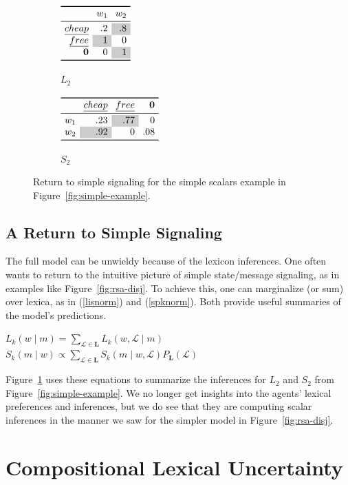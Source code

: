 \documentclass[12pt,twoside]{article}
\newcommand{\Figref}[1]{Figure~\ref{#1}}
\newcommand{\figref}[1]{Figure~\ref{#1}}
\newcommand{\eg}[1]{(\ref{#1})}
\newcommand{\word}[1]{\emph{#1}}
\newcommand{\given}{\mid}
\newcommand{\state}{w}
\newcommand{\Lex}{\mathcal{L}}
\newcommand{\LexSet}{\mathbf{L}}
\newcommand{\msg}{m}
\newcommand{\LexPrior}{P_{\LexSet}}
\newcommand{\SpeakerK}[1][k]{S_{#1}}
\newcommand{\ListenerK}[1][k]{L_{#1}}
\newcommand{\nullmsg}{\mathbf{0}}
\newcommand{\graycell}[1]{{\cellcolor[gray]{.8}#1}}
\newcommand{\lextoprule}{\specialrule{\heavyrulewidth}{1.5pt}{1.5pt}}
\newcommand{\lexmidrule}{\specialrule{\lightrulewidth}{1.5pt}{1.5pt}}
\newcommand{\lexbottomrule}{\specialrule{\heavyrulewidth}{1.5pt}{1.5pt}}
\newcommand{\examplelistener}[4][]{
  \setlength{\arraycolsep}{4pt}
  \begin{array}[c]{*{3}{r}}
    \lextoprule
    #1           & w_{1} & w_{2} \\
    \lexmidrule
    \word{cheap} & #2 \\
    \word{free}  & #3 \\
    \nullmsg     & #4 \\
    \lexbottomrule
  \end{array}}
\newcommand{\examplespeaker}[3][]{
  \setlength{\arraycolsep}{4pt}
  \begin{array}[c]{*{4}{r}}
    \lextoprule
    #1           & \word{cheap} & \word{free} & \nullmsg \\
    \lexmidrule
    w_{1} & #2 \\
    w_{2} & #3 \\
    \lexbottomrule
  \end{array}}
\renewcommand{\_}{\textbf{\textunderscore\hspace{-4pt}\textunderscore\hspace{-3pt}\textunderscore\hspace{-4pt}\textunderscore}\hspace{0.5pt}}			%
\begin{document}
\begin{figure}[tp]
  \centering
  \renewcommand{\arraystretch}{0.85}
  \begin{subfigure}[b]{0.4\textwidth}
    \centering
    $\examplelistener{.2 & \graycell{.8}}{\graycell{1} & 0}{0 & \graycell{1}}$
    \caption{$\ListenerK[2]$}
  \end{subfigure}
  \qquad
  \begin{subfigure}[b]{0.4\textwidth}
    \centering
    $\examplespeaker{.23 & \graycell{.77} & 0}{\graycell{.92} & 0 & .08}$
    \caption{$\SpeakerK[2]$}
  \end{subfigure}
  \caption{Return to simple signaling for the simple scalars example
    in \figref{fig:simple-example}.}
  \label{fig:marginalized}
\end{figure}


\subsection{A Return to Simple Signaling}\label{sec:return}

The full model can be unwieldy because of the lexicon inferences.  One
often wants to return to the intuitive picture of simple state/message
signaling, as in examples like \figref{fig:rsa-disj}. To achieve this,
one can marginalize (or sum) over lexica, as in \eg{lisnorm} and \eg{spknorm}. Both
provide useful summaries of the model's predictions.
%
\begin{exe}
\ex\label{lisnorm} $\ListenerK(\state \given \msg)  = \sum_{\Lex \in \LexSet} \ListenerK(\state, \Lex \given \msg)$
\ex\label{spknorm} $\SpeakerK(\msg \given \state) \propto \sum_{\Lex \in \LexSet} \SpeakerK(\msg \given \state, \Lex) \LexPrior(\Lex)$
\end{exe}
%
\Figref{fig:marginalized} uses these equations to summarize the
inferences for $\ListenerK[2]$ and $\SpeakerK[2]$ from
\figref{fig:simple-example}. We no longer get insights into the
agents' lexical preferences and inferences, but we do see that they
are computing scalar inferences in the manner we saw for the simpler
model in \figref{fig:rsa-disj}.


\section{Compositional Lexical Uncertainty}\label{sec:composition}
\end{document}
